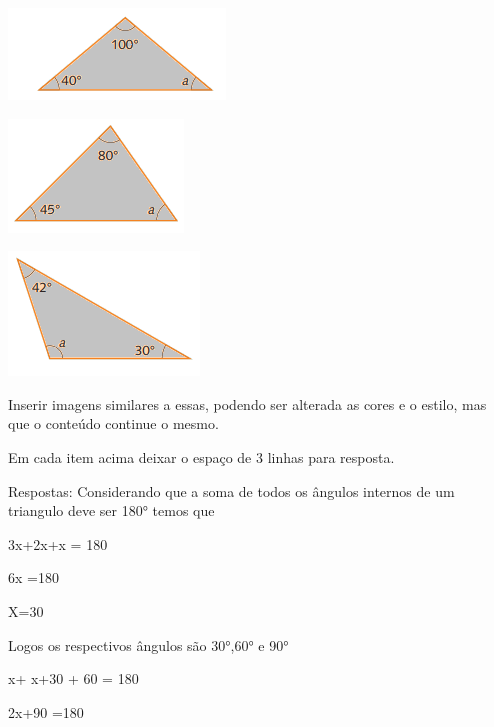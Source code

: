 \item 

\includegraphics[width=2\times 33333in,height=0\times 95833in]{./imgSAEB_8_MAT/media/image27.png}

\item 

\includegraphics[width=1\times 83333in,height=1\times 1875in]{./imgSAEB_8_MAT/media/image28.png}

\item 

\includegraphics[width=2in,height=1\times 30208in]{./imgSAEB_8_MAT/media/image29.png}

\item 

Inserir imagens similares a essas, podendo ser alterada as cores e o
estilo, mas que o conteúdo continue o mesmo.

Em cada item acima deixar o espaço de 3 linhas para resposta.

Respostas: Considerando que a soma de todos os ângulos internos de um
triangulo deve ser 180° temos que

\item 

3x+2x+x = 180

6x =180

X=30

Logos os respectivos ângulos são 30°,60° e 90°

\item x+ x+30 + 60 = 180

2x+90 =180

